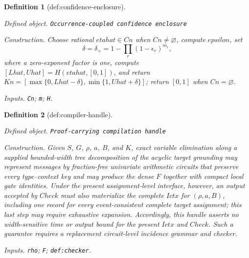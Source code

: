 \documentclass{article}
\newtheorem{definition}{Definition}
\begin{document}
\begin{definition}[def:confidence-enclosure]\label{def:confidence-enclosure}
\par\smallskip\noindent\emph{Defined object.} \texttt{Occurrence-\allowbreak{}coupled confidence enclosure}
\par\smallskip\noindent\emph{Construction.} Choose rational \(etahat\in Cn\) when \(Cn\neq\varnothing\), compute \(epsilon\), set
\[
 \delta=\delta_{\times}=1-\prod_r(1-\epsilon_r)^{m_r},
\]
where a zero-exponent factor is one, compute \([Lhat,Uhat]=H(etahat,[0,1])\), and return \(Kn=[\max\{0,Lhat-\delta\},\min\{1,Uhat+\delta\}]\); return \([0,1]\) when \(Cn=\varnothing\).
\par\smallskip\noindent\emph{Inputs.} \texttt{Cn}; \texttt{m}; \texttt{H}.
\end{definition}

\begin{definition}[def:compiler-handle]\label{def:compiler-handle}
\par\smallskip\noindent\emph{Defined object.} \texttt{Proof-\allowbreak{}carrying compilation handle}
\par\smallskip\noindent\emph{Construction.} Given \(S\), \(G\), \(\rho\), \(a\), \(B\), and \(K\), exact variable elimination along a supplied bounded-width tree decomposition of the acyclic target grounding may represent messages by fraction-free univariate arithmetic circuits that preserve every type--context key and may produce the dense \(F\) together with compact local gate identities.  Under the present assignment-level interface, however, an output accepted by \(Check\) must also materialize the complete \(Ictx\) for \((\rho,a,B)\), including one record for every event-consistent complete target assignment; this last step may require exhaustive expansion.  Accordingly, this handle asserts no width-sensitive time or output bound for the present \(Ictx\) and \(Check\).  Such a guarantee requires a replacement circuit-level incidence grammar and checker.
\par\smallskip\noindent\emph{Inputs.} \texttt{rho}; \texttt{F}; \texttt{def:\allowbreak{}checker}.
\end{definition}
\end{document}

